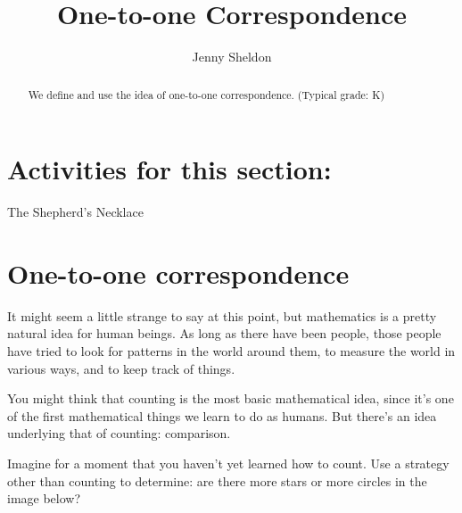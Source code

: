 \documentclass{ximera}
\title{One-to-one Correspondence}
\author{Jenny Sheldon}
\begin{document}
\begin{abstract}
We define and use the idea of one-to-one correspondence. (Typical grade: K)
\end{abstract}
\maketitle

\section{Activities for this section:} The Shepherd's Necklace


\section{One-to-one correspondence}


It might seem a little strange to say at this point, but mathematics is a pretty natural idea for 
human beings. As long as there have been people, those people have tried to look for patterns in the world 
around them, to measure the world in various ways, and to keep track of things.

You might think that counting is the most basic mathematical idea, since it's one of the first mathematical 
things we learn to do as humans. But there's an idea underlying that of counting: comparison.

\begin{question}
Imagine for a moment that you haven't yet learned how to count. Use a strategy other than counting to determine: are there  more stars or more circles in the image below?

\begin{image}
\end{image}

\begin{multipleChoice}
\end{multipleChoice}
\end{question}
\end{document}
